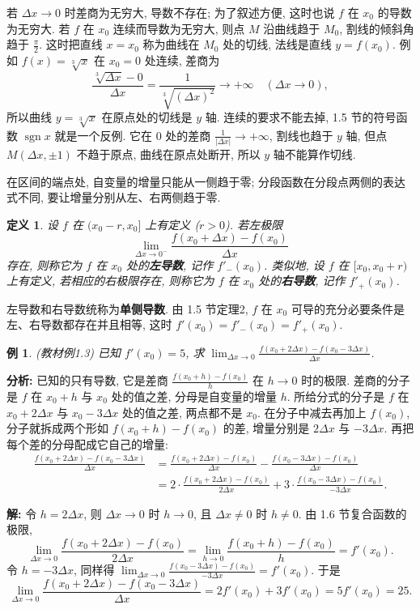 \documentclass[UTF8,openany]{ctexbook}
\theoremstyle{chinesetextbook}
\newtheorem{definition}{定义}[section]
\newtheorem{example}{例}[section]
\newenvironment{cnsolution}{\par\indent\textbf{解:} \ignorespaces}{\par}
\begin{document}
若 $\Delta x\to0$ 时差商为无穷大, 导数不存在; 为了叙述方便, 这时也说 $f$ 在 $x_0$ 的导数为无穷大. 若 $f$ 在 $x_0$ 连续而导数为无穷大, 则点 $M$ 沿曲线趋于 $M_0$, 割线的倾斜角趋于 $\displaystyle\frac\pi2$. 这时把直线 $x=x_0$ 称为曲线在 $M_0$ 处的切线, 法线是直线 $y=f(x_0)$. 例如 $f(x)=\sqrt[3]x$ 在 $x_0=0$ 处连续, 差商为
\[
\frac{\sqrt[3]{\Delta x}-0}{\Delta x}=\frac1{\sqrt[3]{(\Delta x)^2}}\to+\infty\quad(\Delta x\to0),
\]
所以曲线 $y=\sqrt[3]x$ 在原点处的切线是 $y$ 轴. 连续的要求不能去掉, 1.5 节的符号函数 $\operatorname{sgn}x$ 就是一个反例. 它在 $0$ 处的差商 $\displaystyle\frac1{|\Delta x|}\to+\infty$, 割线也趋于 $y$ 轴, 但点 $M(\Delta x,\pm1)$ 不趋于原点, 曲线在原点处断开, 所以 $y$ 轴不能算作切线.

在区间的端点处, 自变量的增量只能从一侧趋于零; 分段函数在分段点两侧的表达式不同, 要让增量分别从左、右两侧趋于零.
\begin{definition}
设 $f$ 在 $(x_0-r,x_0]$ 上有定义 ($r>0$). 若左极限
\[
\lim_{\Delta x\to0^-}\frac{f(x_0+\Delta x)-f(x_0)}{\Delta x}
\]
存在, 则称它为 $f$ 在 $x_0$ 处的\textbf{左导数}, 记作 $f'_-(x_0)$. 类似地, 设 $f$ 在 $[x_0,x_0+r)$ 上有定义, 若相应的右极限存在, 则称它为 $f$ 在 $x_0$ 处的\textbf{右导数}, 记作 $f'_+(x_0)$.
\end{definition}
左导数和右导数统称为\textbf{单侧导数}. 由 1.5 节定理2, $f$ 在 $x_0$ 可导的充分必要条件是左、右导数都存在并且相等, 这时 $f'(x_0)=f'_-(x_0)=f'_+(x_0)$.
\begin{example}\label{ex:c2-1-3}
\textnormal{(教材例1.3)} 已知 $f'(x_0)=5$, 求 $\displaystyle\lim_{\Delta x\to0}\frac{f(x_0+2\Delta x)-f(x_0-3\Delta x)}{\Delta x}$.
\end{example}
\par\indent\textbf{分析:} 已知的只有导数, 它是差商 $\displaystyle\frac{f(x_0+h)-f(x_0)}h$ 在 $h\to0$ 时的极限. 差商的分子是 $f$ 在 $x_0+h$ 与 $x_0$ 处的值之差, 分母是自变量的增量 $h$. 所给分式的分子是 $f$ 在 $x_0+2\Delta x$ 与 $x_0-3\Delta x$ 处的值之差, 两点都不是 $x_0$. 在分子中减去再加上 $f(x_0)$, 分子就拆成两个形如 $f(x_0+h)-f(x_0)$ 的差, 增量分别是 $2\Delta x$ 与 $-3\Delta x$. 再把每个差的分母配成它自己的增量:
\[
\begin{aligned}
\frac{f(x_0+2\Delta x)-f(x_0-3\Delta x)}{\Delta x}&=\frac{f(x_0+2\Delta x)-f(x_0)}{\Delta x}-\frac{f(x_0-3\Delta x)-f(x_0)}{\Delta x}\\
&=2\cdot\frac{f(x_0+2\Delta x)-f(x_0)}{2\Delta x}+3\cdot\frac{f(x_0-3\Delta x)-f(x_0)}{-3\Delta x}.
\end{aligned}
\]
\begin{cnsolution}
令 $h=2\Delta x$, 则 $\Delta x\to0$ 时 $h\to0$, 且 $\Delta x\ne0$ 时 $h\ne0$. 由 1.6 节复合函数的极限,
\[
\lim_{\Delta x\to0}\frac{f(x_0+2\Delta x)-f(x_0)}{2\Delta x}=\lim_{h\to0}\frac{f(x_0+h)-f(x_0)}h=f'(x_0).
\]
令 $h=-3\Delta x$, 同样得 $\displaystyle\lim_{\Delta x\to0}\frac{f(x_0-3\Delta x)-f(x_0)}{-3\Delta x}=f'(x_0)$. 于是
\[
\lim_{\Delta x\to0}\frac{f(x_0+2\Delta x)-f(x_0-3\Delta x)}{\Delta x}=2f'(x_0)+3f'(x_0)=5f'(x_0)=25.
\]
\end{cnsolution}
\end{document}
